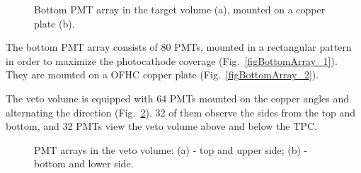 \begin{figure}[!h]
\centering
{}
\caption[Bottom PMT array in the target volume]{Bottom PMT array in the target volume (a), mounted on a copper plate (b).}
\label{figBottomArray}
\end{figure}

The bottom PMT array consists of 80 PMTs, mounted in a rectangular pattern in order to maximize the photocathode coverage (Fig.~\ref{figBottomArray_1}). They are mounted on a OFHC copper plate (Fig.~\ref{figBottomArray_2}).

The veto volume is equipped with 64 PMTs mounted on the copper angles and alternating the direction (Fig.~\ref{figVetoArrays}). 32 of them observe the sides from the top and bottom, and 32 PMTs view the veto volume above and below the TPC.

\begin{figure}[!h]
\centering
{}
\caption[PMT arrays in the veto volume]{PMT arrays in the veto volume: (a) - top and upper side; (b) - bottom and lower side.}
\label{figVetoArrays}
\end{figure}

